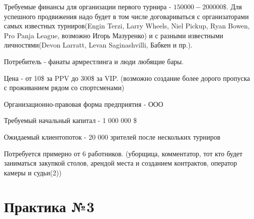 \documentclass[a4paper, 12pt]{article}
\begin{document}
	Требуемые финансы для организации первого турнира - $150 000 - 200 000 \$$. Для успешного продвижения надо будет в том числе договариваться с организаторами самых известных турниров(Engin Terzi, Larry Wheels, Niel Pickup, Ryan Bowen, Pro Panja League, возможно Игорь Мазуренко) и с разными известными личностями(Devon Larratt, Levan Saginashvilli, Бабкен и пр.). 
	
	Потребитель - фанаты армрестлинга и люди любящие бары.
	
	Цена - от 10\$ за PPV до 300\$ за VIP. (возможно создание более дорого пропуска с проживанием рядом со спортсменами)
	
	Организационно-правовая форма предприятия - ООО
	
	Требуемый начальный капитал - 1 000 000 \$
	
	Ожидаемый клиентопоток - 20 000 зрителей после нескольких турниров
	
	Потребуется примерно от 6 работников. (уборщица, комментатор, тот кто будет заниматься закупкой столов, арендой места и созданием контрактов, оператор камеры и судьи(2))
	
	\part*{Практика №3}
\end{document}

